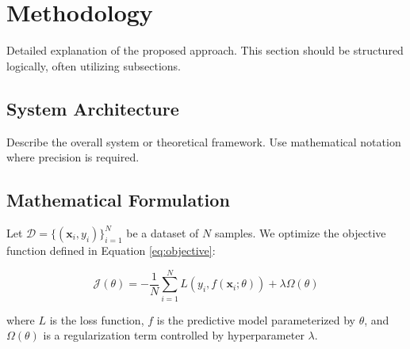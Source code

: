 \section{Methodology}
\label{sec:method}

Detailed explanation of the proposed approach. This section should be structured logically, often utilizing subsections.

\subsection{System Architecture}
Describe the overall system or theoretical framework. Use mathematical notation where precision is required.

\subsection{Mathematical Formulation}
Let $\mathcal{D} = \{(\mathbf{x}_i, y_i)\}_{i=1}^N$ be a dataset of $N$ samples. We optimize the objective function defined in Equation \ref{eq:objective}:

\begin{equation}
    \mathcal{J}(\theta) = - \frac{1}{N} \sum_{i=1}^N L(y_i, f(\mathbf{x}_i; \theta)) + \lambda \Omega(\theta)
    \label{eq:objective}
\end{equation}

where $L$ is the loss function, $f$ is the predictive model parameterized by $\theta$, and $\Omega(\theta)$ is a regularization term controlled by hyperparameter $\lambda$.
